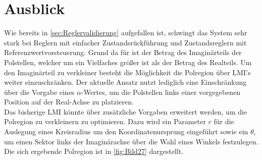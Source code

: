 \section{Ausblick} \label{sec:ausblick}

Wie bereits in \autoref{sec:Reglervalidierung} aufgefallen ist, schwingt das System sehr stark bei Reglern mit einfacher Zustandsrückführung und Zustandsreglern mit Referenzwertvorsteuerung. Grund da für ist der Betrag des Imaginärteils der Polstellen, welcher um ein Vielfaches größer ist als der Betrag des Realteils. Um den Imaginärteil zu verkleiner besteht die Möglichkeit die Polregion über LMI's weiter einzuschränken. Der aktuelle Ansatz nutzt lediglich eine Einschränkung über die Vorgabe eines $\alpha$-Wertes, um die Polstellen links einer vorgegebenen Position auf der Real-Achse zu platzieren.\\
Das bisherige LMI könnte über zusätzliche Vorgaben erweitert werden, um die Polregion zu verkleinern \bzw zu optimieren. Dazu wird ein Parameter $r$ für die Auslegung eines Kreisradius um den Koordinatenursprung eingeführt sowie ein $\theta$, um einen Sektor links der Imaginärachse über die Wahl eines Winkels festzulegen. Die sich ergebende Polregion ist in \autoref{fig:Bild27} dargestellt.\\

